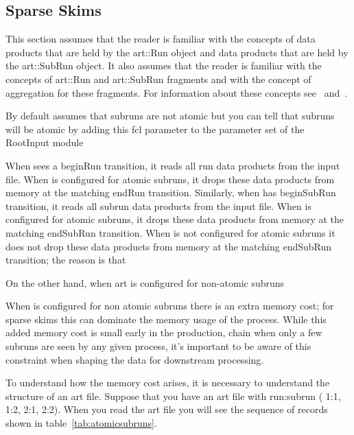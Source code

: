 \subsection{Sparse Skims}

This section assumes that the reader is familiar with the \art concepts
of data products that are held by the {\code art::Run} object
and data products that are held by the {\code art::SubRun} object.
It also assumes that the reader is familiar with the \art concepts
of {\code art::Run} and {\code art::SubRun} fragments
and with the concept of aggregation for these fragments.
For information about these concepts see~\cite{RunAndSubRunProducts}
and~\cite{ProductAggregation}.


By default \art assumes that subruns are not atomic
but you can tell \art that subruns will be atomic by adding this fcl
parameter to the parameter set of the RootInput module


When \art sees a beginRun transition, it reads all run data products from the input file.
When \art is configured for atomic subruns, it drops these data products
from memory at the matching endRun transition.
Similarly, when \art has beginSubRun transition, it reads all subrun data products from the input file.
When \art is configured for atomic subruns, it drops these data products
from memory at the matching endSubRun transition.
When \art is not configured for atomic subruns it does not drop these data products from
memory at the matching endSubRun transition; the reason is that 

On the other hand, when art is configured for non-atomic subruns

When \art is configured for non atomic subruns there is an extra memory cost;
for sparse skims this can dominate the memory usage of the process.
While this added memory cost is small early in the production, chain when
only a few subruns are seen by any given process, it's important to be
aware of this constraint when shaping the data for downstream processing.

To understand how the memory cost arises,
it is necessary to understand the structure of an art file.
Suppose that you have an art file with run:subrun ( 1:1, 1:2, 2:1, 2:2).
When you read the art file you will see the sequence of records shown
in table~\ref{tab:atomicsubruns}.

